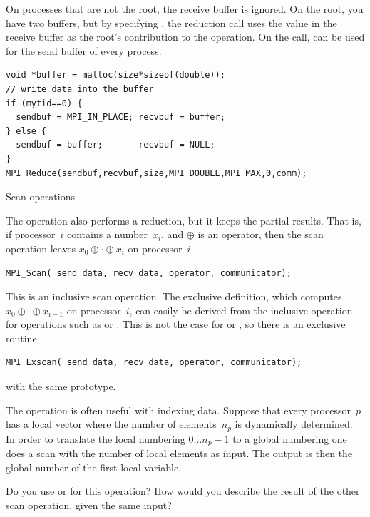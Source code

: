 On processes that are not the root, the receive buffer is ignored. On the root, 
you have two buffers, but by specifying , the reduction call
uses the value in the receive buffer as the root's contribution to the operation.
On the  call,  can be used for the send buffer of
every process.

\begin{verbatim}
void *buffer = malloc(size*sizeof(double));
// write data into the buffer
if (mytid==0) {
  sendbuf = MPI_IN_PLACE; recvbuf = buffer;
} else {
  sendbuf = buffer;       recvbuf = NULL;
}
MPI_Reduce(sendbuf,recvbuf,size,MPI_DOUBLE,MPI_MAX,0,comm);
\end{verbatim}

 {Scan operations}

The  operation also performs a reduction, but it keeps 
the partial results. That is, if processor~$i$ contains a number~$x_i$, 
and $\oplus$ is an operator,
then the scan operation leaves $x_0\oplus\cdot\oplus x_i$ on processor~$i$.
\begin{verbatim}
MPI_Scan( send data, recv data, operator, communicator);
\end{verbatim}
This is an inclusive scan operation. The exclusive definition, which computes
$x_0\oplus\cdot\oplus x_{i-1}$ on processor~$i$, can easily be derived
from the inclusive operation for operations such as  or .
This is not the case for  or , so there is an
exclusive routine
\begin{verbatim}
MPI_Exscan( send data, recv data, operator, communicator);
\end{verbatim}
with the same prototype. 

The  operation is often useful with indexing data. Suppose that
every processor~$p$ has a local vector where the number of elements~$n_p$ is dynamically 
determined. In order to translate the local numbering $0\ldots n_p-1$ to a global numbering
one does a scan with the number of local elements as input. The output is then the global 
number of the first local variable.

\begin{exercise}
  Do you use  or  for this operation? How
  would you describe the result of the other scan operation, given the
  same input?
\end{exercise}

